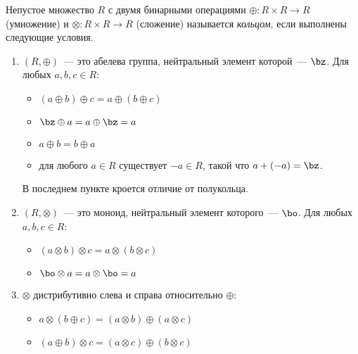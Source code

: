 \begin{definition}[Кольцо]
    Непустое множество $R$ с двумя бинарными операциями $\oplus: R \times R \to R$ (умножение) и $\otimes: R \times R \to R$ (сложение) называется \emph{кольцом}, если выполнены следующие условия.
    \begin{enumerate}
        \item $(R, \oplus)$~--- это абелева группа, нейтральный элемент которой~--- $\bz$.
              Для любых $a, b, c \in R$:
              \begin{itemize}
                  \item $(a \oplus b) \oplus c = a \oplus (b \oplus c)$
                  \item $\bz \oplus a = a \oplus \bz = a$
                  \item $a \oplus b = b \oplus a$
                  \item для любого $a \in R$ существует $-a \in  R$, такой что $a + (-a) = \bz$.
              \end{itemize}
              В последнем пункте кроется отличие от полукольца.
        \item $(R, \otimes)$~--- это моноид, нейтральный элемент которого~--- $\bo$.
              Для любых $a, b, c \in R$:
              \begin{itemize}
                  \item $(a \otimes b) \otimes c = a \otimes (b \otimes c)$
                  \item $\bo \otimes a = a \otimes \bo = a$
              \end{itemize}
        \item $\otimes$ дистрибутивно слева и справа относительно $\oplus$:
              \begin{itemize}
                  \item $a \otimes (b \oplus c) = (a \otimes b) \oplus (a \otimes c)$
                  \item $(a \oplus b) \otimes c = (a \otimes c) \oplus (b \otimes c)$
              \end{itemize}
    \end{enumerate}
\end{definition}

